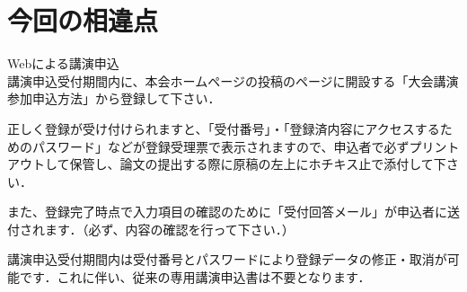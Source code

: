 \section{今回の相違点}
\begin{newenumerate}
\item Webによる講演申込 \\
講演申込受付期間内に、本会ホームページの投稿のページに開設する「大会講演参加申込方法」から登録して下さい．

正しく登録が受け付けられますと、「受付番号」・「登録済内容にアクセスするためのパスワード」などが登録受理票で表示されますので、申込者で必ずプリントアウトして保管し、論文の提出する際に原稿の左上にホチキス止で添付して下さい．

また、登録完了時点で入力項目の確認のために「受付回答メール」が申込者に送付されます．（必ず、内容の確認を行って下さい．）

講演申込受付期間内は受付番号とパスワードにより登録データの修正・取消が可能です．これに伴い、従来の専用講演申込書は不要となります．
\end{newenumerate}

